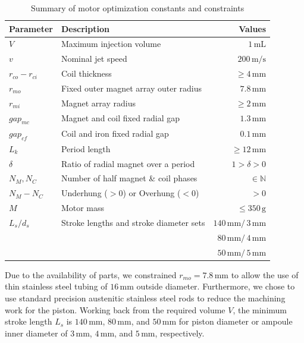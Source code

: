     \begin{table}[h]
        \renewcommand{\arraystretch}{1.2}
        \caption{Summary of motor optimization constants and constraints}
        \label{table:chap/experiment/table of optimization value ranges}
        \centering
        \begin{tabular}{llr}
        \hline
        \bfseries Parameter & \bfseries Description & \bfseries Values\\
        \hline
        	$V$ 			& Maximum injection volume 				&	$1\,\mathrm{mL}$\\
            $v$				& Nominal jet speed						&	$200\,\mathrm{m/s}$\\
            $r_{co}-r_{ci}$	& Coil thickness 						&	$\geq4\,\mathrm{mm}$\\ 
            $r_{mo}$		& Fixed outer magnet array outer radius &	$7.8\,\mathrm{mm}$\\
            $r_{mi}$		& Magnet array radius 					&	$\geq2\,\mathrm{mm}$\\ 
            $gap_{mc}$		& Magnet and coil fixed radial gap 		&	$1.3\,\mathrm{mm}$\\ 
            $gap_{cf}$		& Coil and iron fixed radial gap 		&	$0.1\,\mathrm{mm}$\\ 
            $L_k$			& Period length	 						&	$\geq12\,\mathrm{mm}$\\
            $\delta$		& Ratio of radial magnet over a period	& 	$1> \delta >0$\\
        \hline
        	$N_M,N_C$		& Number of half magnet \& coil phases	&	$\in\mathbb{N}$\\ 
            $N_M-N_C$		& Underhung ($>0$) or Overhung ($<0$)	&	$>0$\\ 
            $M$				& Motor mass							&	$\leq350\,\mathrm{g}$\\ 
            $L_s/d_s$		& Stroke lengths and stroke diameter sets		&	$140\,\mathrm{mm}/\,3\,\mathrm{mm}$\\ 
            				& 										& 	$80\,\mathrm{mm}/\,4\,\mathrm{mm}$\\
                        	& 										& 	$50\,\mathrm{mm}/\,5\,\mathrm{mm}$\\
        \hline
        \end{tabular}
    \end{table}
    
    
    Due to the availability of parts, we constrained $r_{mo}=7.8\,\mathrm{mm}$ to allow the use of thin stainless steel tubing of $16\,\mathrm{mm}$ outside diameter. Furthermore, we chose to use standard precision austenitic stainless steel rods to reduce the machining work for the piston. Working back from the required volume $V$, the minimum stroke length $L_s$ is $140\,\mathrm{mm}$, $80\,\mathrm{mm}$, and $50\,\mathrm{mm}$ for piston diameter or ampoule inner diameter of $3\,\mathrm{mm}$, $4\,\mathrm{mm}$, and $5\,\mathrm{mm}$, respectively.
    
